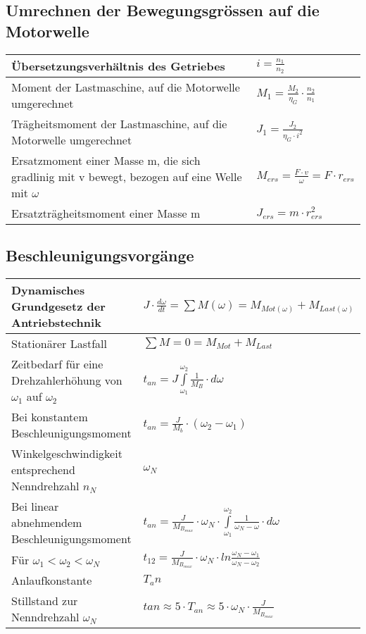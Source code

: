 \subsection{Umrechnen der Bewegungsgrössen auf die Motorwelle}
\begin{tabular}[c]{ | p{14cm} | p{3.5cm} | }
	\hline
	Übersetzungsverhältnis des Getriebes & $i=\frac{n_1}{n_2}$\\
	\hline
	Moment der Lastmaschine, auf die Motorwelle umgerechnet &
	$M_1=\frac{M_2}{\eta_G}\cdot\frac{n_2}{n_1}$\\
	\hline
	Trägheitsmoment der Lastmaschine, auf die Motorwelle umgerechnet &
	$J_1=\frac{J_2}{\eta_G\cdot i^2}$\\
	\hline
	Ersatzmoment einer Masse m, die sich gradlinig mit v bewegt, bezogen auf eine
	Welle mit $\omega$ & $M_{ers}=\frac{F\cdot v}{\omega}=F\cdot r_{ers}$\\
	\hline
	Ersatzträgheitsmoment einer Masse m & $J_{ers}=m\cdot r_{ers}^2$ \\
	\hline
\end{tabular}

\subsection{Beschleunigungsvorgänge}
\begin{tabular}[c]{ | p{9cm} | p{8.5cm} | }
	\hline
	Dynamisches Grundgesetz der Antriebstechnik & $J\cdot\frac{d\omega}{dt}= \sum
	M(\omega)=M_{Mot(\omega)}+M_{Last(\omega)}$\\
	\hline
	Stationärer Lastfall & $\sum M=0=M_{Mot}+M_{Last}$\\
	\hline
	Zeitbedarf für eine Drehzahlerhöhung von $\omega_1$ auf $\omega_2$ &
	$t_{an}=J\int\limits_{\omega_1}^{\omega_2}\frac{1}{M_B}\cdot d\omega$ \\
	\hline
	Bei konstantem Beschleunigungsmoment &
	$t_{an}=\frac{J}{M_b}\cdot\left(\omega_2-\omega_1\right)$ \\
	\hline
	Winkelgeschwindigkeit entsprechend Nenndrehzahl $n_N$ & $\omega_N$\\
	\hline
	Bei linear abnehmendem Beschleunigungsmoment &
	$t_{an}=\frac{J}{M_{B_{max}}}\cdot\omega_N\cdot\int\limits_{\omega_1}^{\omega_2}\frac{1}{\omega_N-\omega}\cdot
	d\omega$ \\
	\hline
	Für $\omega_1 < \omega_2 < \omega_N$ &
	$t_{12}=\frac{J}{M_{B_{max}}}\cdot\omega_N\cdot
	ln\frac{\omega_N-\omega_1}{\omega_N-\omega_2}$ \\
	\hline
	Anlaufkonstante & $T_an$\\
	\hline
	Stillstand zur Nenndrehzahl $\omega_N$ & $t{an}\approx 5\cdot T_{an}\approx
	5\cdot\omega_N\cdot\frac{J}{M_{B_{max}}}$\\
	\hline
\end{tabular}

